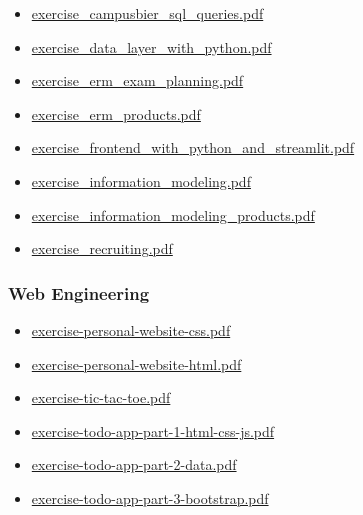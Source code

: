 \documentclass[
  letterpaper,
  DIV=11]{scrartcl}
\providecommand{\tightlist}{%
  \setlength{\itemsep}{0pt}\setlength{\parskip}{0pt}}\usepackage{longtable,booktabs,array}
\begin{document}
\begin{itemize}
\tightlist
\item
  \href{quarto/information_management/exercise_campusbier_sql_queries.pdf}{exercise\_campusbier\_sql\_queries.pdf}
\item
  \href{quarto/information_management/exercise_data_layer_with_python.pdf}{exercise\_data\_layer\_with\_python.pdf}
\item
  \href{quarto/information_management/exercise_erm_exam_planning.pdf}{exercise\_erm\_exam\_planning.pdf}
\item
  \href{quarto/information_management/exercise_erm_products.pdf}{exercise\_erm\_products.pdf}
\item
  \href{quarto/information_management/exercise_frontend_with_python_and_streamlit.pdf}{exercise\_frontend\_with\_python\_and\_streamlit.pdf}
\item
  \href{quarto/information_management/exercise_information_modeling.pdf}{exercise\_information\_modeling.pdf}
\item
  \href{quarto/information_management/exercise_information_modeling_products.pdf}{exercise\_information\_modeling\_products.pdf}
\item
  \href{quarto/information_management/exercise_recruiting.pdf}{exercise\_recruiting.pdf}
\end{itemize}

\subsubsection{Web Engineering}\label{web-engineering-1}

\begin{itemize}
\tightlist
\item
  \href{quarto/web_engineering/exercise-personal-website-css.pdf}{exercise-personal-website-css.pdf}
\item
  \href{quarto/web_engineering/exercise-personal-website-html.pdf}{exercise-personal-website-html.pdf}
\item
  \href{quarto/web_engineering/exercise-tic-tac-toe.pdf}{exercise-tic-tac-toe.pdf}
\item
  \href{quarto/web_engineering/exercise-todo-app-part-1-html-css-js.pdf}{exercise-todo-app-part-1-html-css-js.pdf}
\item
  \href{quarto/web_engineering/exercise-todo-app-part-2-data.pdf}{exercise-todo-app-part-2-data.pdf}
\item
  \href{quarto/web_engineering/exercise-todo-app-part-3-bootstrap.pdf}{exercise-todo-app-part-3-bootstrap.pdf}
\end{itemize}
\end{document}
